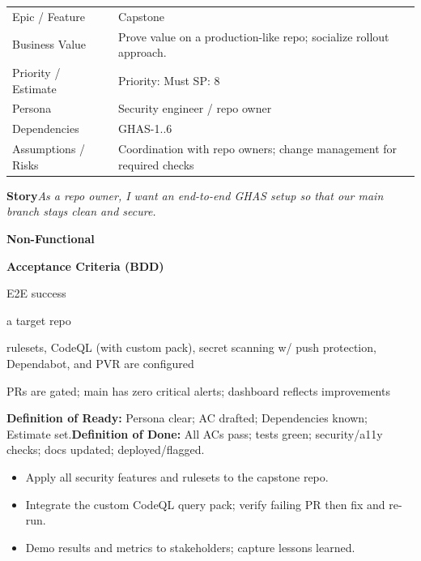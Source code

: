 \documentclass[11pt,a4paper]{article}
\newcommand{\cb}{\(\square\)}
\newenvironment{GHASCard}[2]{%
  \begin{tcolorbox}[ghascard,title={\ghasheader{#1 --- #2}}]
  \small
}{%
  \end{tcolorbox}
}
\newenvironment{GHASTasks}{%
  \begin{tcolorbox}[ghastasks]
  \small
  \begin{itemize}[label=\cb, leftmargin=*, labelsep=0.6em]
}{%
  \end{itemize}
  \end{tcolorbox}
}
\newcommand{\DoR}{\textbf{Definition of Ready:} Persona clear; AC drafted; Dependencies known; Estimate set.}
\newcommand{\DoD}{\textbf{Definition of Done:} All ACs pass; tests green; security/a11y checks; docs updated; deployed/flagged.}
\begin{document}
\begin{GHASCard}{GHAS-7}{Capstone: End-to-End Implementation}
\begin{tabularx}{\linewidth}{L V}
Epic / Feature & Capstone \tabularnewline
Business Value & Prove value on a production-like repo; socialize rollout approach. \tabularnewline
Priority / Estimate & Priority: Must \quad SP: 8 \tabularnewline
Persona & Security engineer / repo owner \tabularnewline
Dependencies & GHAS-1..6 \tabularnewline
Assumptions / Risks & Coordination with repo owners; change management for required checks \tabularnewline
\end{tabularx}

\medskip
\textbf{Story}\quad \emph{As a repo owner, I want an end-to-end GHAS setup so that our main branch stays clean and secure.}

\medskip
\textbf{Non-Functional}\quad
{}\ \ 

\medskip
\textbf{Acceptance Criteria (BDD)}
\begin{description}[leftmargin=2.7cm, labelwidth=2.6cm, style=nextline]
  \item[\textbf{Scenario}] E2E success
  \item[\textbf{Given}] a target repo
  \item[\textbf{When}] rulesets, CodeQL (with custom pack), secret scanning w/ push protection, Dependabot, and PVR are configured
  \item[\textbf{Then}] PRs are gated; main has zero critical alerts; dashboard reflects improvements
\end{description}

\medskip
\DoR\quad\textbullet\quad\DoD
\end{GHASCard}

\begin{GHASTasks}
\item Apply all security features and rulesets to the capstone repo.
\item Integrate the custom CodeQL query pack; verify failing PR then fix and re-run.
\item Demo results and metrics to stakeholders; capture lessons learned.
\end{GHASTasks}
\clearpage
\end{document}
